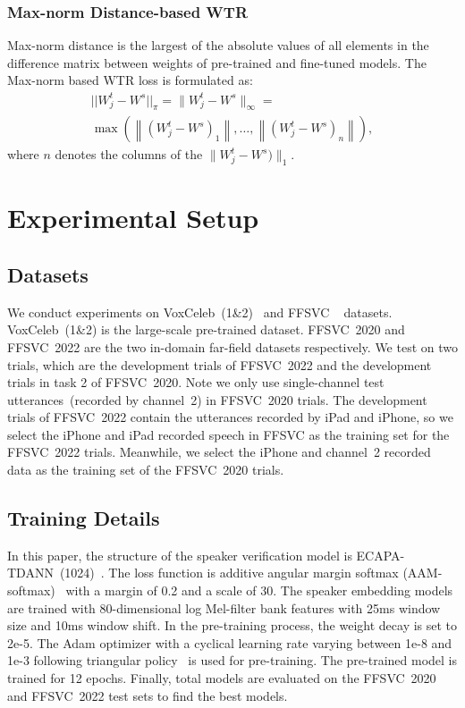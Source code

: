 \documentclass{article}
\begin{document}
\subsubsection{Max-norm Distance-based WTR}
Max-norm distance is the largest of the absolute values of all elements in the difference matrix between weights of pre-trained and fine-tuned models. The Max-norm based WTR loss is formulated as:
\begin{equation}
\begin{aligned}
||W_j^t - W^s ||_\pi = \|{W_j^t - W^s}\|_{\infty} = \\ \max \left(\left\|(W_j^t - W^s)_1\right\|, \ldots,\left\|(W_j^t - W^s)_n\right\|\right),
\end{aligned}
\label{maxnorm}
\end{equation}
where $n$ denotes the columns of the $\|W_j^t - W^s)\|_1$. 
\section{Experimental Setup}
\subsection{Datasets}
We conduct experiments on VoxCeleb~(1\&2)~\cite{Nagrani19} and FFSVC ~\cite{qin2020ffsvc,qin2022far} datasets. VoxCeleb~(1\&2) is the large-scale pre-trained dataset. FFSVC~2020 and FFSVC~2022 are the two in-domain far-field datasets respectively. We test on two trials, which are the development trials of FFSVC~2022 and the development trials in task 2 of FFSVC~2020. Note we only use single-channel test utterances~(recorded by channel~2) in FFSVC~2020 trials. The development trials of FFSVC~2022 contain the utterances recorded by iPad and iPhone, so we select the iPhone and iPad recorded speech in FFSVC as the training set for the FFSVC~2022 trials. Meanwhile, we select the iPhone and channel~2 recorded data as the training set of the FFSVC~2020 trials.  
\subsection{Training Details}
In this paper, the structure of the speaker verification model is ECAPA-TDANN~(1024)~\cite{desplanques2020ecapa}. The loss function is additive angular margin softmax (AAM-softmax)~\cite{deng2019arcface} with a margin of 0.2 and a scale of 30. The speaker embedding models are trained with 80-dimensional log Mel-filter bank features with 25ms window size and 10ms window shift. In the pre-training process, the weight decay is set to 2e-5. The Adam optimizer with a cyclical learning rate varying between 1e-8 and 1e-3 following triangular policy~\cite{smith2017cyclical} is used for pre-training. The pre-trained model is trained for 12 epochs. Finally, total models are evaluated on the FFSVC~2020 and FFSVC~2022 test sets to find the best models.  
\end{document}
